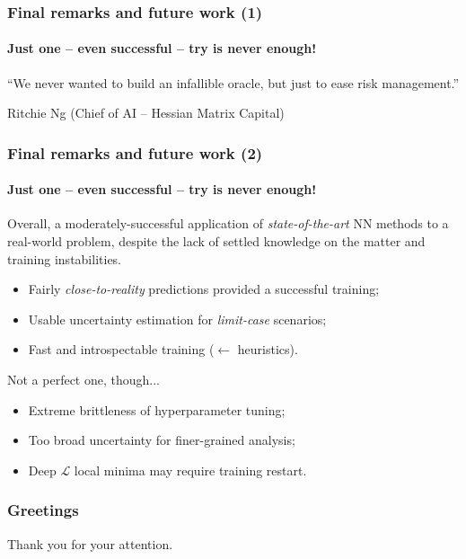 \documentclass{beamer}
\begin{document}
{\begin{frame}
\end{frame}
\begin{frame}
	\frametitle{Final remarks and future work (1)}
	\framesubtitle{Just one -- even successful -- try is never enough!}

	\begin{displayquote}
		“We never wanted to build an infallible oracle, but just to ease risk management.”
		\begin{flushright}Ritchie Ng (Chief of AI -- Hessian Matrix Capital) \end{flushright}
	\end{displayquote}

\end{frame}


\begin{frame}
	\frametitle{Final remarks and future work (2)}
	\framesubtitle{Just one -- even successful -- try is never enough!}

	Overall, a moderately-successful application of \textit{state-of-the-art} NN methods to a real-world problem, despite the lack of settled knowledge on the matter and training instabilities.
	\hfill \break
	\begin{itemize}
		\item{Fairly \textit{close-to-reality} predictions provided a successful training;}
		\item{Usable uncertainty estimation for \textit{limit-case} scenarios;}
		\item{Fast and introspectable training ($\leftarrow$ heuristics).}
	\end{itemize}
	\hfill \break
	Not a perfect one, though...
	\hfill \break
	\begin{itemize}
		\item{Extreme brittleness of hyperparameter tuning;}
		\item{Too broad uncertainty for finer-grained analysis;}
		\item{Deep $\mathcal{L}$ local minima may require training restart.}
	\end{itemize}

\end{frame}
}

\begin{frame}
	\frametitle{Greetings}
	Thank you for your attention.
\end{frame}

\end{document}
